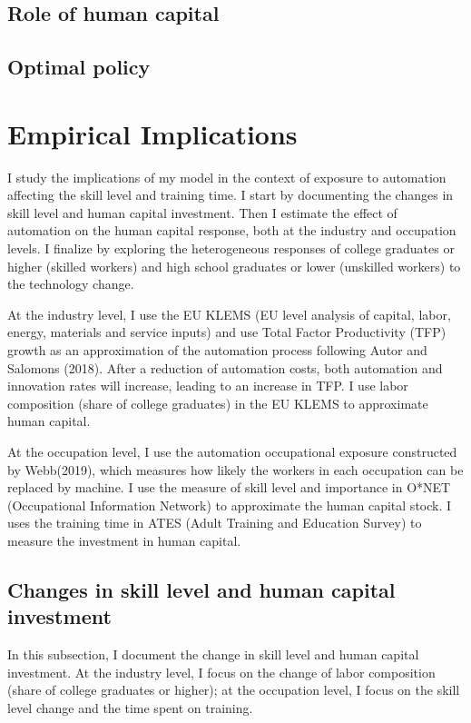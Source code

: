 \documentclass[12pt]{article}
\begin{document}
\subsection{Role of human capital}


\subsection{Optimal policy}


\section{Empirical Implications}
I study the implications of my model in the context of exposure to automation affecting the skill level and training time. I start by documenting the changes in skill level and human capital investment. Then I estimate the effect of automation on the human capital response, both at the industry and occupation levels. I finalize by exploring the heterogeneous responses of college graduates or higher (skilled workers) and high school graduates or lower (unskilled workers) to the technology change. 

At the industry level, I use the EU KLEMS (EU level analysis of capital, labor, energy, materials and service inputs) and use Total Factor Productivity (TFP) growth as an approximation of the automation process following Autor and Salomons (2018)\nocite{AutorSalomons2018}. After a reduction of automation costs, both automation and innovation rates will increase, leading to an increase in TFP. I use labor composition (share of college graduates) in the EU KLEMS to approximate human capital. 

At the occupation level, I use the automation occupational exposure constructed by Webb(2019)\nocite{Webb2019}, which measures how likely the workers in each occupation can be replaced by machine. I use the measure of skill level and importance in O*NET (Occupational Information Network) to approximate the human capital stock. I uses the training time in ATES (Adult Training and Education Survey) to measure the investment in human capital. 

\subsection{Changes in skill level and human capital investment}
In this subsection, I document the change in skill level and human capital investment. At the industry level, I focus on the change of labor composition (share of college graduates or higher); at the occupation level, I focus on the skill level change and the time spent on training. 
 
\end{document}
